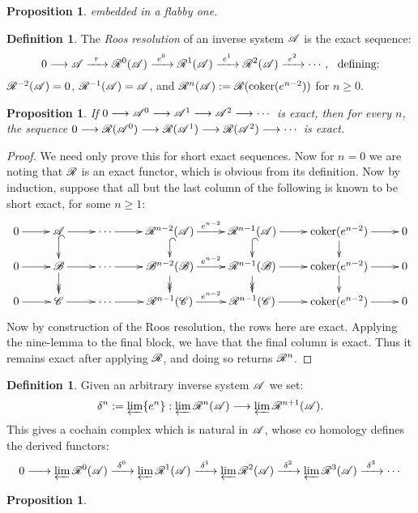 \documentclass[11pt]{article}
\theoremstyle{plain}
\newtheorem{prop}[thm]{Proposition}
\theoremstyle{definition}
\newtheorem{defn}[thm]{Definition}
\begin{document}
{\begin{prop}
embedded in a flabby one.
\end{prop}
\begin{defn}
The \emph{Roos resolution} of an inverse system $\mathscr{A}$ is the exact sequence:
\[0\to\scrA\xrightarrow{\ \,r\,\ }\scrR^0(\scrA)\xrightarrow{\ e^0\ }
\scrR^1(\scrA)\xrightarrow{\ e^1\ }\scrR^2(\scrA)\xrightarrow{\ e^2\ }\cdots,
\textup{ \ defining:}\]
$\mathscr{R}^{-2}(\mathscr{A})=0$, $\mathscr{R}^{-1}(\mathscr{A})=\mathscr{A}$, and
$\mathscr{R}^n(\mathscr{A}):=\mathscr{R}(\operatorname{coker} (e^{n-2}))$ for
$n\geq0$.
\end{defn}
\begin{prop}
If $0\longrightarrow\mathscr{A}^0\longrightarrow\mathscr{A}^1\longrightarrow\mathscr{A}^2\longrightarrow\cdots$ is exact, then for every $n$, the
sequence $0\longrightarrow\mathscr{R}(\mathscr{A}^0)\longrightarrow\mathscr{R}(\mathscr{A}^1)\longrightarrow\mathscr{R}(\mathscr{A}^2)\longrightarrow\cdots$ is
exact.
\end{prop}
\begin{proof}We need only prove this for short exact sequences. Now for $n=0$ we
are noting that $\mathscr{R}$ is an exact functor, which is obvious from its
definition. Now by induction, suppose that all but the last column of the
following is known to be short exact, for some $n\geq1$:
\[\xymatrix@R=.5cm{
0\ar[r]&\scrA\ar[r]\ar@{^{(}->}[d]&\cdots\ar[r]&\scrR^{n-2
}(\scrA)\ar[r]^{e^{n-2}}\ar@{^{(}->}[d]&\ar@{^{(}->}[d]\scrR^{n-1}
(\scrA)\ar[r]&\coker(e^{n-2})\ar[d]\ar[r]&0\\
0\ar[r]&\scrB\ar[r]\ar@{->>}[d]   &\cdots\ar[r]&\scrB^{n-2}
(\scrB)\ar[r]^{e^{n-2}}\ar@{->>}[d]   &\ar@{->>}[d]   \scrR^{n-1}
(\scrB)\ar[r]&\coker(e^{n-2})\ar[d]\ar[r]&0\\
0\ar[r]&\scrC\ar[r]&\cdots\ar[r]&\scrR^{n-1}(\scrC)\ar[r]^{e^{n-2}}&
\scrR^{n-1}(\scrC)\ar[r]&\coker(e^{n-2})\ar[r]&0
}\]
Now by construction of the Roos resolution, the rows here are exact. Applying
the nine-lemma to the final block, we have that the final column is exact. Thus
it remains exact after applying $\mathscr{R}$, and doing so returns $\mathscr{R}^{n}$.
\end{proof}
\begin{defn}
Given an arbitrary inverse system $\mathscr{A}$ we set:
\[\delta^n:=\varprojlim\{e^n\}:
\varprojlim\mathscr{R}^n(\mathscr{A})\longrightarrow\varprojlim\mathscr{R}^{n+1}(\mathscr{A}).\]
This gives a cochain complex which is natural in $\mathscr{A}$, whose co homology
defines the derived functors:
\[0\xrightarrow{\ \phantom{\delta^0}\ }
\varprojlim\scrR^0(\scrA)\xrightarrow{\ \delta^0\ }
\varprojlim\scrR^1(\scrA)\xrightarrow{\ \delta^1\ }
\varprojlim\scrR^2(\scrA)\xrightarrow{\ \delta^2\ }
\varprojlim\scrR^3(\scrA)\xrightarrow{\ \delta^3\ }\cdots\]
\end{defn}
\begin{prop}

\end{prop}}
\end{document}
